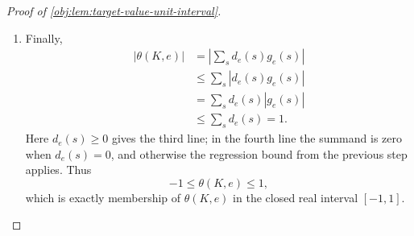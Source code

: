 \begin{proof}[Proof of \cref{obj:lem:target-value-unit-interval}]
\begin{enumerate}
\item Finally,
\[
\begin{aligned}
|\theta(K,e)|
&=
\left|\sum_s d_e(s)g_e(s)\right| \\
&\le
\sum_s |d_e(s)g_e(s)| \\
&=
\sum_s d_e(s)|g_e(s)| \\
&\le
\sum_s d_e(s)
=1.
\end{aligned}
\]
Here \(d_e(s)\ge0\) gives the third line; in the fourth line the summand is zero when \(d_e(s)=0\), and otherwise the regression bound from the previous step applies. Thus
\[
-1\le \theta(K,e)\le 1,
\]
which is exactly membership of \(\theta(K,e)\) in the closed real interval \([-1,1]\).
\end{enumerate}
\end{proof}
